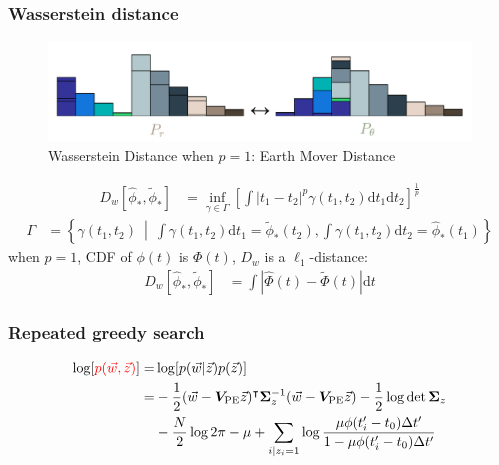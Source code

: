 \documentclass{beamer}
\begin{document}
\begin{CJK*}{UTF8}{gbsn}
\begin{frame}
\frametitle{Wasserstein distance}
\begin{figure}
    \centering
    \includegraphics[width=1.0\linewidth]{img/WD.png}
    \caption{Wasserstein Distance when $p=1$: Earth Mover Distance}  
\end{figure}
\begin{align*}
  D_w\left[\hat{\phi}_*, \tilde{\phi}_*\right] &= \inf_{\gamma \in \Gamma} \left[\int \left\vert t_1 - t_2 \right\vert^p \gamma(t_1, t_2)\mathrm{d}t_1\mathrm{d}t_2\right]^{\frac{1}{p}}
\end{align*}
\begin{align*}
  \Gamma &= \left\{\gamma(t_1, t_2) ~\middle\vert~ \int\gamma(t_1,t_2)\mathrm{d}t_1 = \tilde{\phi}_*(t_2) , \int\gamma(t_1,t_2)\mathrm{d}t_2 = \hat{\phi}_*(t_1) \right\}
\end{align*}
when $p=1$, CDF of $\phi(t)$ is $\Phi(t)$, $D_w$ is a $\ell_1$-distance:
\begin{align*}
  D_w\left[\hat{\phi}_*, \tilde{\phi}_*\right] &= \int\left|\hat{\Phi}(t) - \tilde{\Phi}(t)\right| \mathrm{d}t
\end{align*}
\end{frame}

\begin{frame}
\frametitle{Repeated greedy search}
\begin{align*}
    \log[\textcolor{red}{p(\vec{w},\vec{z})}] =& \log[p(\vec{w}|\vec{z})p(\vec{z})] \\
    =& -\frac{1}{2}(\vec{w}-\bm{V}_\mathrm{PE}\vec{z})^\intercal\bm{\Sigma}_z^{-1}(\vec{w}-\bm{V}_\mathrm{PE}\vec{z})-\frac{1}{2}\log\det\bm{\Sigma}_z \\ 
    &-\frac{N}{2}\log2\pi -\mu + \sum_{i|z_i=1}\log \frac{\mu \phi(t'_i - t_0) \Delta t'}{1-\mu \phi(t'_i - t_0) \Delta t'}
\end{align*}
\end{frame}

\begin{frame}


\end{frame}
\end{CJK*}
\end{document}
